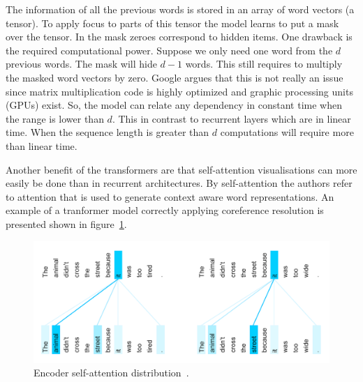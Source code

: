 The information of all the previous words is stored in an array of word vectors (a tensor).
To apply focus to parts of this tensor the model learns to put a mask over the tensor.
In the mask zeroes correspond to hidden items.
One drawback is the required computational power.
Suppose we only need one word from the $d$ previous words.
The mask will hide $d-1$ words.
This still requires to multiply the masked word vectors by zero.
Google argues that this is not really an issue since matrix multiplication code is highly optimized and graphic processing units (GPUs) exist.
So, the model can relate any dependency in constant time when the range is lower than $d$.
This in contrast to recurrent layers which are in linear time.
When the sequence length is greater than $d$ computations will require more than linear time.

Another benefit of the transformers are that self-attention visualisations can more easily be done than in recurrent architectures.
By self-attention the authors refer to attention that is used to generate context aware word representations.
An example of a tranformer model correctly applying coreference resolution is presented shown in figure~\ref{fig:coreference_resolution}.

\begin{figure}[htbp]
    \begin{center}
        \includegraphics[width=\textwidth]{figures/coreference_resolution.png}
    \end{center}
    \caption{Encoder self-attention distribution~\citep{uszkoreit2017}.}
    \label{fig:coreference_resolution}
\end{figure}


